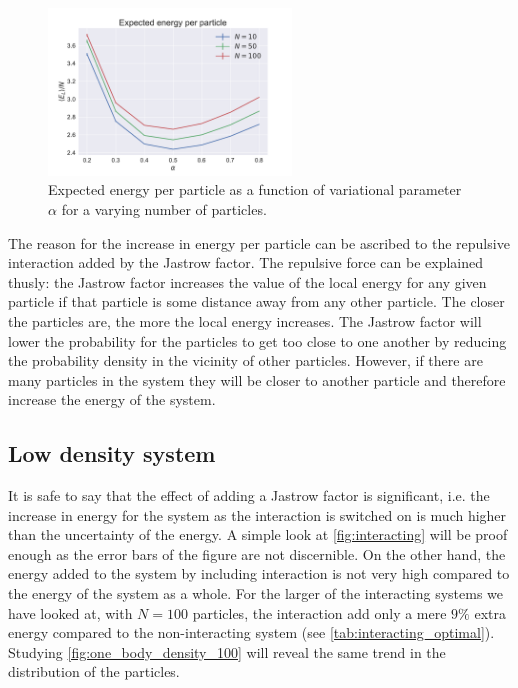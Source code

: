 \documentclass[
    a4paper, aps, twocolumn, floatfix, superscriptaddress,
    nofootinbib]{revtex4-1}
\newcommand{\1}{\mathds{1}}
\begin{document}
        \begin{figure}
            \includegraphics[width=244px]{../data/figures/problem_e.pdf}
            \caption{Expected energy per particle as a function of variational
            parameter $\alpha$ for a varying number of particles.}
            \label{fig:interacting}
        \end{figure}

        The reason for the increase in energy per particle can be ascribed to
        the repulsive interaction added by the Jastrow factor. The repulsive
        force can be explained thusly: the Jastrow factor  increases the value
        of the local energy for any given particle if that particle is some
        distance away from any other particle. The closer the particles are, the
        more the local energy increases. The Jastrow factor will lower the
        probability for the particles to get too close to one another by
        reducing the probability density in the vicinity of other particles.
        However, if there are many particles in the system they will be closer
        to another particle and therefore increase the energy of the system.

    \subsection{Low density system}
        It is safe to say that the effect of adding a Jastrow factor is
        significant, i.e. the increase in energy for the system as the
        interaction is switched on is much higher than the uncertainty of the
        energy. A simple look at \autoref{fig:interacting} will be proof enough
        as the error bars of the figure are not discernible.  On the other hand,
        the energy added to the system by including interaction is not very high
        compared to the energy of the system as a whole. For the larger of the
        interacting systems we have looked at, with $N=100$ particles, the
        interaction add only a mere $9\%$ extra energy compared to the
        non-interacting system (see \autoref{tab:interacting_optimal}).
        Studying \autoref{fig:one_body_density_100} will reveal the same trend
        in the distribution of the particles.
\end{document}
